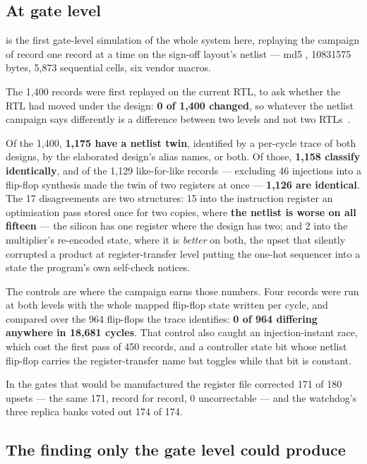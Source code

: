 \subsection{At gate level}

 is the first gate-level simulation of the whole system here, replaying the campaign of record one record at a time on the sign-off layout's netlist --- md5 , \num{10831575} bytes, 5,873 sequential cells, six vendor macros.

The 1,400 records were first replayed on the current RTL, to ask whether the RTL had moved under the design: \textbf{0 of 1,400 changed}, so whatever the netlist campaign says differently is a difference between two levels and not two RTLs~\cite{cho2013}.

Of the 1,400, \textbf{1,175 have a netlist twin}, identified by a per-cycle trace of both designs, by the elaborated design's alias names, or both. Of those, \textbf{1,158 classify identically}, and of the 1,129 like-for-like records --- excluding 46 injections into a flip-flop synthesis made the twin of two registers at once --- \textbf{1,126 are identical}. The 17 disagreements
are two structures: 15 into the instruction register an optimisation
pass stored once for two copies, where \textbf{the netlist is worse on
all fifteen} --- the silicon has one register where the design has two;
and 2 into the multiplier's re-encoded state, where it is \emph{better}
on both, the upset that silently corrupted a product at
register-transfer level putting the one-hot sequencer into a state the
program's own self-check notices.

The controls are where the campaign earns those numbers. Four records were run at both levels with the whole mapped flip-flop state written per cycle, and compared over the 964 flip-flops the trace identifies: \textbf{0 of 964 differing anywhere in 18,681 cycles}. That control also caught an injection-instant race, which cost the first pass of 450 records, and a controller state bit whose netlist flip-flop carries the register-transfer name but toggles while that bit is constant.

In the gates that would be manufactured the register file corrected 171 of 180 upsets --- the same 171, record for record, 0 uncorrectable --- and the watchdog's three replica banks voted out 174 of 174.

\subsection{The finding only the gate level could produce}

